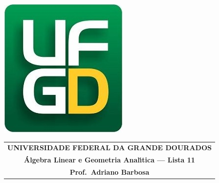 \documentclass[a4paper,5pt]{amsbook}
\begin{document}
\thispagestyle{empty}
\pagestyle{empty}
\begin{minipage}[h]{0.14\textwidth}
	\includegraphics[scale=0.24]{../../ufgd.png}
\end{minipage}
\begin{minipage}[h]{\textwidth}
\begin{tabular}{c}
{{\bf UNIVERSIDADE FEDERAL DA GRANDE DOURADOS}}\\
{{\bf \'{A}lgebra Linear e Geometria Anal\'{\i}tica --- Lista 11}}\\
{{\bf Prof.\ Adriano Barbosa}}\\
\end{tabular}
\vspace{-0.45cm}
%
\end{minipage}

\end{document}
